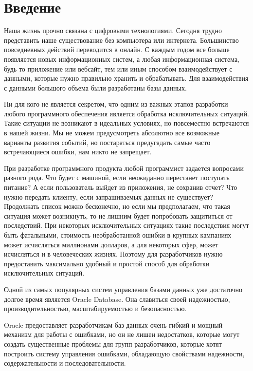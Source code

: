 \chapter*{Введение} %

Наша жизнь прочно связана с цифровыми технологиями. Сегодня трудно представить наше существование без компьютера или интернета. Большинство повседневных действий переводится в онлайн. С каждым годом все больше появляется новых информационных систем, а любая информационная система, будь то приложение или вебсайт, тем или иным способом взаимодействует с данными, которые нужно правильно хранить и обрабатывать. Для взаимодействия с данными большого объема были разработаны базы данных. 

Ни для кого не является секретом, что одним из важных этапов разработки любого программного обеспечения является обработка исключительных ситуаций. Такие ситуации не возникают в идеальных условиях, но повсеместно встречаются в нашей жизни. Мы не можем предусмотреть абсолютно все возможные варианты развития событий, но постараться предугадать самые часто встречающиеся ошибки, нам никто не запрещает. 

При разработке программного продукта любой программист задается вопросами разного рода. Что будет с машиной, если неожиданно перестанет поступать питание? А если пользователь выйдет из приложения, не сохранив отчет? Что нужно передать клиенту, если запрашиваемых данных не существует? Продолжать список можно бесконечно, но если мы предполагаем, что такая ситуация может возникнуть, то не лишним будет попробовать защититься от последствий. При некоторых исключительных ситуациях такие последствия могут быть фатальными, стоимость необработанной ошибки в крупных кампаниях может исчисляться миллионами долларов, а для некоторых сфер, может исчисляться и в человеческих жизнях. Поэтому для разработчиков нужно предоставить максимально удобный и простой способ для обработки исключительных ситуаций. 

Одной из самых популярных систем управления базами данных уже достаточно долгое время является Oracle Database. Она славиться своей надежностью, производительностью, масштабируемостью и безопасностью.

Oracle предоставляет разработчикам баз данных очень гибкий и мощный механизм для работы с ошибками, но он не лишен недостатков, которые могут создать существенные проблемы для групп разработчиков, которые хотят построить систему управления ошибками, обладающую свойствами надежности, содержательности и последовательности.

